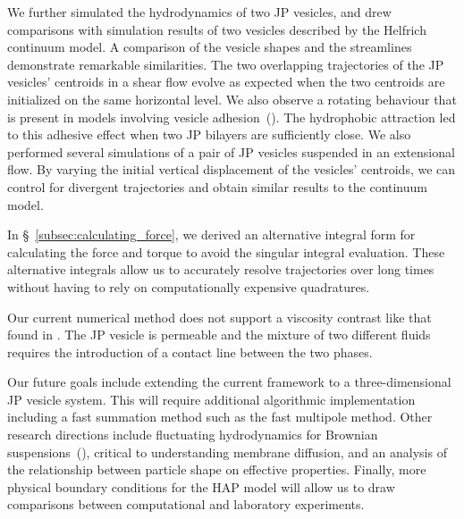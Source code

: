 \documentclass[lineno]{jfm}
\begin{document}

We further simulated the hydrodynamics of two JP vesicles, and drew
comparisons with simulation results of two vesicles described by the
Helfrich continuum model. A comparison of the vesicle shapes and the
streamlines demonstrate remarkable similarities. The two overlapping
trajectories of the JP vesicles' centroids in a shear flow evolve as
expected when the two centroids are initialized on the same horizontal
level. We also observe a rotating behaviour that is present in models
involving vesicle adhesion~(\cite{qua-vee-you2019}). The hydrophobic
attraction led to this adhesive effect when two JP bilayers are
sufficiently close. We also performed several simulations of a pair of
JP vesicles suspended in an extensional flow. By varying the initial
vertical displacement of the vesicles' centroids, we can control for
divergent trajectories and obtain similar results to the continuum
model.

In \S~\ref{subsec:calculating_force}, we derived an alternative integral
form for calculating the force and torque to avoid the singular integral
evaluation. These alternative integrals allow us to accurately resolve
trajectories over long times without having to rely on computationally
expensive quadratures.

Our current numerical method does not support a viscosity contrast
like that found in
\citep{PhysRevLett.106.158103,
  PhysRevE.75.016313,
  Kaoui2016}.
The JP vesicle is permeable and the mixture of two different
fluids requires the introduction of a contact line between
the two phases.

Our future goals include extending the current framework to a
three-dimensional JP vesicle system. This will require additional
algorithmic implementation including a fast summation method such as the
fast multipole method. Other research directions include
fluctuating hydrodynamics for Brownian suspensions~(\cite{Bao2018}),
critical to understanding membrane diffusion,
and an analysis of the relationship between particle shape on effective
properties.
Finally, more
physical boundary conditions for the HAP model will allow us to draw
comparisons between computational and laboratory experiments.
\end{document}

